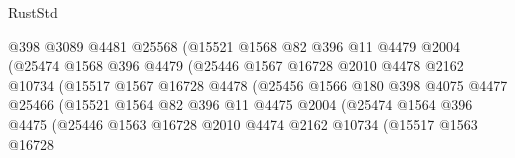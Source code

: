 \begin{lexlean}{RustStd}
\begin{coremodule}
                                  @398
                                  @3089
                                  @4481
                                  @25568
                                  (@15521
                                    @1568
                                    @82
                                    @396
                                    @11
                                    @4479
                                    @2004
                                    (@25474
                                      @1568
                                      @396
                                      @4479
                                      (@25446
                                        @1567
                                        @16728
                                        @2010
                                        @4478
                                        @2162
                                        @10734
                                        (@15517
                                          @1567
                                          @16728
                                          @4478
                                          (@25456
                                            @1566
                                            @180
                                            @398
                                            @4075
                                            @4477
                                            @25466
                                            (@15521
                                              @1564
                                              @82
                                              @396
                                              @11
                                              @4475
                                              @2004
                                              (@25474
                                                @1564
                                                @396
                                                @4475
                                                (@25446
                                                  @1563
                                                  @16728
                                                  @2010
                                                  @4474
                                                  @2162
                                                  @10734
                                                  (@15517
                                                    @1563
                                                    @16728

\end{coremodule}
\end{lexlean}
